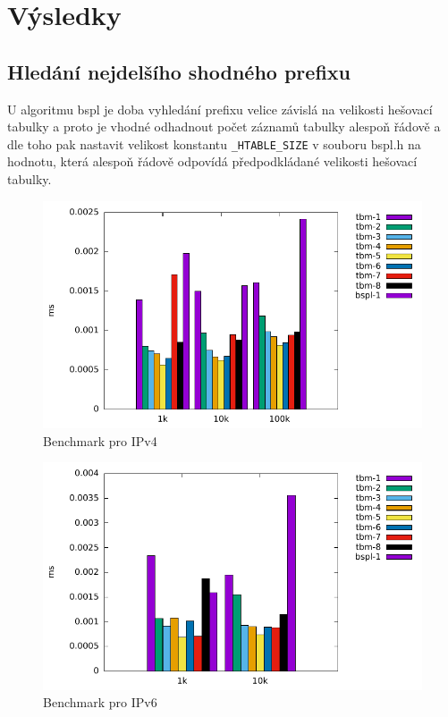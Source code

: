 \chapter{Výsledky}\label{chapter:results}

\section{Hledání nejdelšího shodného prefixu}
U algoritmu bspl je doba vyhledání prefixu velice závislá na velikosti hešovací tabulky a proto je vhodné odhadnout počet záznamů tabulky alespoň řádově a dle toho pak nastavit velikost konstantu {\tt \_HTABLE\_SIZE} v souboru bspl.h na hodnotu, která alespoň řádově odpovídá předpodkládané velikosti hešovací tabulky.

\begin{figure}[!htb]
	\centering
	\includegraphics[scale=1]{fig/lpm-ipv4.pdf}
	\caption{Benchmark pro IPv4}
\end{figure}\label{fig:lpm-ipv4}

\begin{figure}[!htb]
	\centering
	\includegraphics[scale=1]{fig/lpm-ipv6.pdf}
	\caption{Benchmark pro IPv6}
\end{figure}\label{fig:lpm-ipv4}

